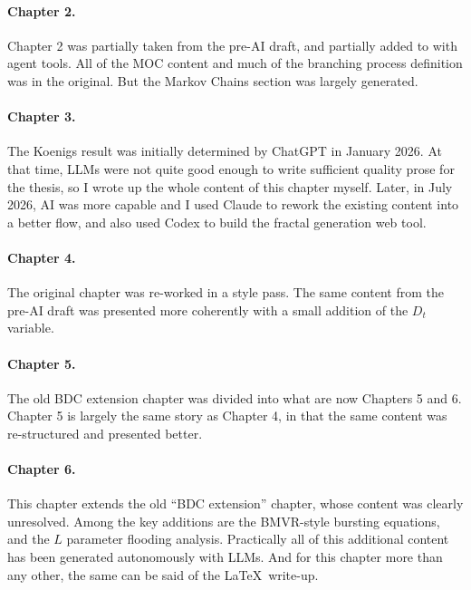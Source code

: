 \paragraph{Chapter 2.}
Chapter 2 was partially taken from the pre-AI draft, and partially added to with agent tools. All of the MOC content and much of the branching process definition was in the original. But the Markov Chains section was largely generated.

\paragraph{Chapter 3.}
The Koenigs result was initially determined by ChatGPT in January 2026. At that time, LLMs were not quite good enough to write sufficient quality prose for the thesis, so I wrote up the whole content of this chapter myself. Later, in July 2026, AI was more capable and I used Claude to rework the existing content into a better flow, and also used Codex to build the fractal generation web tool.

\paragraph{Chapter 4.}
The original chapter was re-worked in a style pass. The same content from the pre-AI draft was presented more coherently with a small addition of the $D_t$ variable.

\paragraph{Chapter 5.}
The old BDC extension chapter was divided into what are now Chapters 5 and 6. Chapter 5 is largely the same story as Chapter 4, in that the same content was re-structured and presented better.

\paragraph{Chapter 6.}
This chapter extends the old ``BDC extension'' chapter, whose content was clearly unresolved. Among the key additions are the BMVR-style bursting equations, and the $L$ parameter flooding analysis. Practically all of this additional content has been generated autonomously with LLMs. And for this chapter more than any other, the same can be said of the \LaTeX\ write-up.

